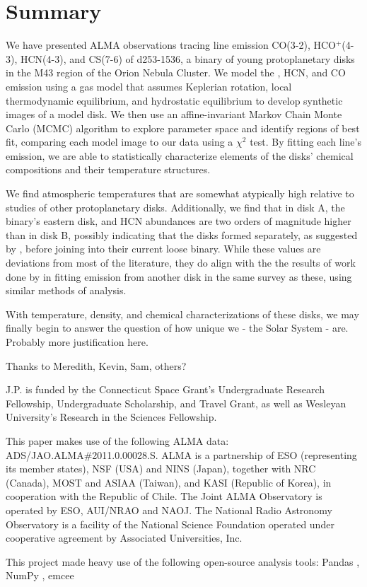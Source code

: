 \chapter{Summary}
\label{chap:Summary}


We have presented ALMA observations tracing line emission CO(3-2), HCO$^+$(4-3), HCN(4-3), and CS(7-6) of d253-1536, a binary of young protoplanetary disks in the M43 region of the Orion Nebula Cluster. We model the \hco, HCN, and CO emission using a gas model that assumes Keplerian rotation, local thermodynamic equilibrium, and hydrostatic equilibrium to develop synthetic images of a model disk. We then use an affine-invariant Markov Chain Monte Carlo (MCMC) algorithm to explore parameter space and identify regions of best fit, comparing each model image to our data using a $\chi^2$ test. By fitting each line's emission, we are able to statistically characterize elements of the disks' chemical compositions and their temperature structures.

We find atmospheric temperatures that are somewhat atypically high relative to studies of other protoplanetary disks. Additionally, we find that in disk A, the binary's eastern disk, \hco and HCN abundances are two orders of magnitude higher than in disk B, possibly indicating that the disks formed separately, as suggested by \cite{Williams2014}, before joining into their current loose binary. While these values are deviations from most of the literature, they do align with the the results of work done by \citet{Factor2017} in fitting \hco emission from another disk in the same survey as these, using similar methods of analysis.

With temperature, density, and chemical characterizations of these disks, we may finally begin to answer the question of how unique we - the Solar System - are. Probably more justification here.



\bigskip
\bigskip
\bigskip


Thanks to Meredith, Kevin, Sam, others?

J.P. is funded by the Connecticut Space Grant's Undergraduate Research Fellowship, Undergraduate Scholarship, and Travel Grant, as well as Wesleyan University’s Research in the Sciences Fellowship.

This paper makes use of the following ALMA data: ADS/JAO.ALMA\#2011.0.00028.S. ALMA is a partnership of ESO (representing its member states), NSF (USA) and NINS (Japan), together with NRC (Canada), MOST and ASIAA (Taiwan), and KASI (Republic of Korea), in cooperation with the Republic of Chile. The Joint ALMA Observatory is operated by ESO, AUI/NRAO and NAOJ. The National Radio Astronomy Observatory is a facility of the National Science Foundation operated under cooperative agreement by Associated Universities, Inc.


This project made heavy use of the following open-source analysis tools: Pandas \citep{McKinney2010,McKinney2011}, NumPy \citep{VanDerWalt2011}, emcee \citep{ForemanMackey2013}
